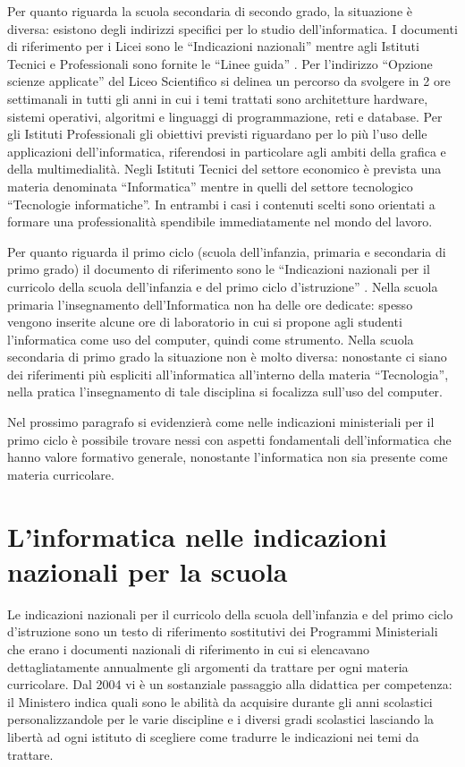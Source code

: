 \documentclass[12pt]{report}
\begin{document}
Per quanto riguarda la scuola secondaria di secondo grado, la situazione è diversa: esistono degli indirizzi specifici per lo studio dell'informatica. I documenti di riferimento per i Licei sono le ``Indicazioni nazionali'' \cite{IndicazioniLicei} mentre agli Istituti Tecnici e Professionali sono fornite le ``Linee guida'' \cite{IndicazioniIstituti}.
Per l'indirizzo “Opzione scienze applicate” del Liceo Scientifico si delinea un percorso da svolgere in 2 ore settimanali in tutti gli anni in cui i temi trattati sono architetture hardware, sistemi operativi, algoritmi e linguaggi di programmazione, reti e database.
Per gli Istituti Professionali gli obiettivi previsti riguardano per lo più l'uso delle applicazioni dell'informatica, riferendosi in particolare agli ambiti della grafica e della multimedialità.
Negli Istituti Tecnici del settore economico è prevista una materia denominata ``Informatica'' mentre in quelli del settore tecnologico ``Tecnologie informatiche''. In entrambi i casi i contenuti scelti sono orientati a formare una professionalità spendibile immediatamente nel mondo del lavoro.

Per quanto riguarda il primo ciclo (scuola dell'infanzia, primaria e secondaria di primo grado) il documento di riferimento sono le ``Indicazioni nazionali per il curricolo della scuola dell'infanzia e del primo ciclo d'istruzione'' \cite{indicazioniNazionali}.
Nella scuola primaria l'insegnamento dell'Informatica non ha delle ore dedicate: spesso vengono inserite alcune ore di laboratorio in cui si propone agli studenti l'informatica come uso del computer, quindi come strumento.
Nella scuola secondaria di primo grado la situazione non è molto diversa: nonostante ci siano dei riferimenti più espliciti all'informatica all'interno della materia ``Tecnologia'', nella pratica l'insegnamento di tale disciplina si focalizza sull'uso del computer.


Nel prossimo paragrafo si evidenzierà come nelle indicazioni ministeriali per il primo ciclo è possibile trovare nessi con aspetti fondamentali dell'informatica che hanno valore formativo generale, nonostante l'informatica non sia presente come materia curricolare.
\section{L'informatica nelle indicazioni nazionali per la scuola}
\label{indicazioni}
Le indicazioni nazionali per il curricolo della scuola dell'infanzia e del primo ciclo d’istruzione \cite{indicazioniNazionali} sono un testo di riferimento sostitutivi dei Programmi Ministeriali che erano i documenti nazionali di riferimento in cui si elencavano dettagliatamente annualmente gli argomenti da trattare per ogni materia curricolare. Dal 2004 vi è un sostanziale passaggio alla didattica per competenza: il Ministero indica quali sono le abilità da acquisire durante gli anni scolastici personalizzandole per le varie discipline e i diversi gradi scolastici lasciando la libertà ad ogni istituto di scegliere come tradurre le indicazioni nei temi da trattare.
\end{document}
